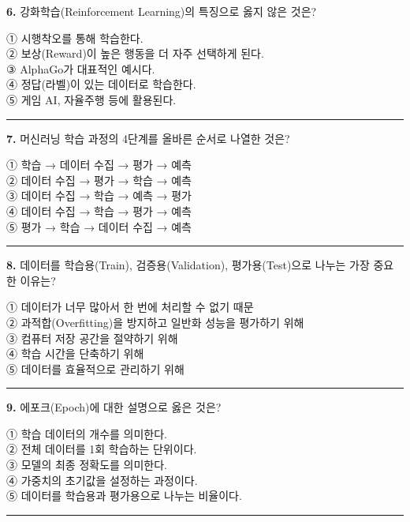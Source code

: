 \documentclass[a4paper, 11pt]{article}
\begin{document}
\textbf{6.} 강화학습(Reinforcement Learning)의 특징으로 옳지 않은 것은?

① 시행착오를 통해 학습한다.\\
② 보상(Reward)이 높은 행동을 더 자주 선택하게 된다.\\
③ AlphaGo가 대표적인 예시다.\\
④ 정답(라벨)이 있는 데이터로 학습한다.\\
⑤ 게임 AI, 자율주행 등에 활용된다.

\begin{center}\rule{0.5\linewidth}{0.5pt}\end{center}

\textbf{7.} 머신러닝 학습 과정의 4단계를 올바른 순서로 나열한 것은?

① 학습 → 데이터 수집 → 평가 → 예측\\
② 데이터 수집 → 평가 → 학습 → 예측\\
③ 데이터 수집 → 학습 → 예측 → 평가\\
④ 데이터 수집 → 학습 → 평가 → 예측\\
⑤ 평가 → 학습 → 데이터 수집 → 예측

\begin{center}\rule{0.5\linewidth}{0.5pt}\end{center}

\textbf{8.} 데이터를 학습용(Train), 검증용(Validation), 평가용(Test)으로
나누는 가장 중요한 이유는?

① 데이터가 너무 많아서 한 번에 처리할 수 없기 때문\\
② 과적합(Overfitting)을 방지하고 일반화 성능을 평가하기 위해\\
③ 컴퓨터 저장 공간을 절약하기 위해\\
④ 학습 시간을 단축하기 위해\\
⑤ 데이터를 효율적으로 관리하기 위해

\begin{center}\rule{0.5\linewidth}{0.5pt}\end{center}

\textbf{9.} 에포크(Epoch)에 대한 설명으로 옳은 것은?

① 학습 데이터의 개수를 의미한다.\\
② 전체 데이터를 1회 학습하는 단위이다.\\
③ 모델의 최종 정확도를 의미한다.\\
④ 가중치의 초기값을 설정하는 과정이다.\\
⑤ 데이터를 학습용과 평가용으로 나누는 비율이다.

\begin{center}\rule{0.5\linewidth}{0.5pt}\end{center}
\end{document}
